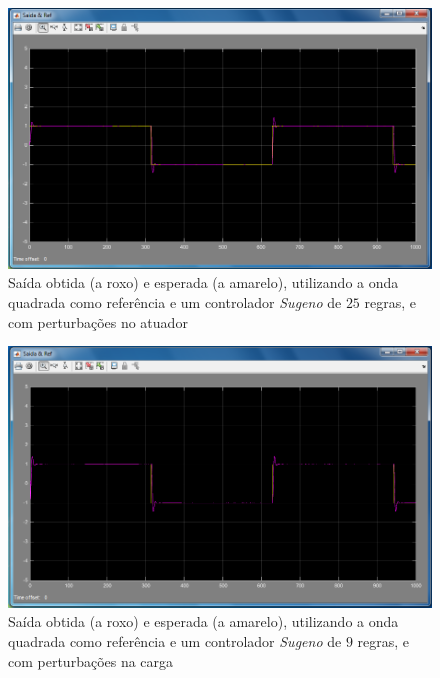 \documentclass{article}
\begin{document}
\begin{figure}[h]
  \centering
      \includegraphics[scale=0.3]{Images/Sugeno_25_square_actuator.png}
  \caption{Saída obtida (a roxo) e esperada (a amarelo), utilizando a onda quadrada como referência e um controlador \emph{Sugeno} de $25$ regras, e com perturbações no atuador}
\end{figure}

\begin{figure}[h]
  \centering
      \includegraphics[scale=0.3]{Images/Sugeno_25_square_charge.png}
  \caption{Saída obtida (a roxo) e esperada (a amarelo), utilizando a onda quadrada como referência e um controlador \emph{Sugeno} de $9$ regras, e com perturbações na carga}
\end{figure}
\end{document}

